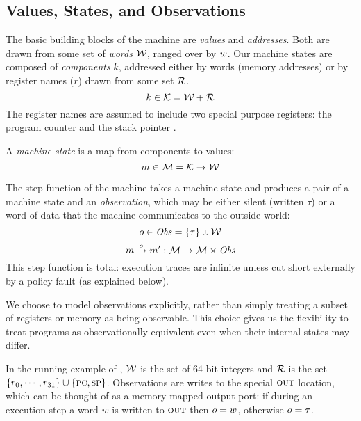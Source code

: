 \documentclass[acmsmall,review,anonymous]{acmart}\settopmatter{printfolios=true,printccs=false,printacmref=false}
\begin{document}
\subsection{Values, States, and Observations}

The basic building blocks of the machine are {\em values} and {\em
  addresses}. Both are drawn from some set of {\em words}
${\mathcal W}$, ranged over by $w$.
%
Our machine states are composed of {\em components} $k$, addressed either by
words (memory addresses) or by register names ($r$) drawn from some set
${\mathcal R}$.
%
    \[k \in {\mathcal K} = {\mathcal W} + {\mathcal R} \]
%
The register names are assumed to include two special purpose registers: the
program counter {\PCname} and the stack pointer \SP.

A {\em machine state} is a map from components to values:
%
\[m \in {\mathcal M} = {\mathcal K} \rightarrow {\mathcal W}\]

The step function of the machine takes a machine state and produces a
pair of a machine state and an {\em observation}, which may be either
silent (written $\tau$) or a word of data that the machine
communicates to the outside world:
%
\[o \in \mathit{Obs} = \{\tau\} \uplus {\mathcal W}\]
\[m \xrightarrow{o} m' : {\mathcal M} \rightarrow {\mathcal M} \times \mathit{Obs} \]
%
This step function is total: execution traces are infinite unless
cut short externally by a policy fault (as explained below).

We choose to model observations explicitly, rather than simply
treating
a subset of registers or memory as being observable.  This choice gives
us the flexibility to treat programs as observationally equivalent even when
their internal states may differ.

In the running example of ,
${\mathcal W}$ is the
set of 64-bit integers and ${\mathcal R}$ is the set $\{r_0, \cdots, r_{31}\}
\cup \{\textsc{pc},\textsc{sp}\}$. Observations are writes to the
special $\textsc{out}$ location, which can be thought of as a memory-mapped
  output port: if during an execution step a word $w$ is
written to $\textsc{out}$ then $o = w$, otherwise $o = \tau$.
\end{document}
